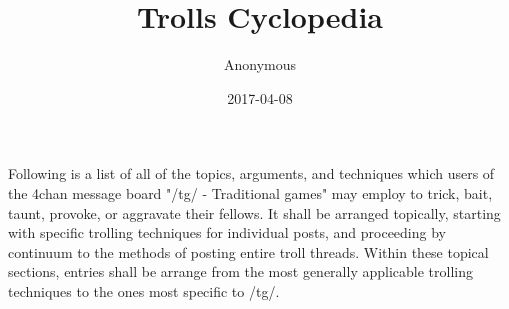 \documentclass{book}
\title{Trolls Cyclopedia}
\date{2017-04-08}
\author{Anonymous}
\begin{document}
	\maketitle
	\newpage

	Following is a list of all of the topics, arguments, and techniques which users of the 4chan message board "/tg/ - Traditional games" may employ to trick, bait, taunt, provoke, or aggravate their fellows.  It shall be arranged topically, starting with specific trolling techniques for individual posts, and proceeding by continuum to the methods of posting entire troll threads.  Within these topical sections, entries shall be arrange from the most generally applicable trolling techniques to the ones most specific to /tg/.
\end{document}
